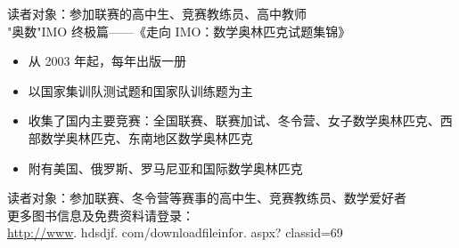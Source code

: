 \documentclass[10pt]{article}
\begin{document}
读者对象：参加联赛的高中生、竞赛教练员、高中教师\\
"奥数"IMO 终极篇——《走向 IMO：数学奥林匹克试题集锦》

\begin{itemize}
  \item 从 2003 年起，每年出版一册
  \item 以国家集训队测试题和国家队训练题为主
  \item 收集了国内主要竞赛：全国联赛、联赛加试、冬令营、女子数学奥林匹克、西部数学奥林匹克、东南地区数学奥林匹克
  \item 附有美国、俄罗斯、罗马尼亚和国际数学奥林匹克
\end{itemize}

读者对象：参加联赛、冬令营等赛事的高中生、竞赛教练员、数学爱好者\\
更多图书信息及免费资料请登录：\\
\href{http://www}{http://www}. hdsdjf. com/downloadfileinfor. aspx? classid=69
\end{document}
